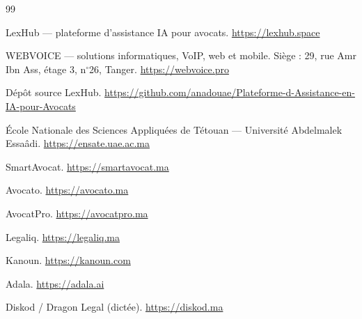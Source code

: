 \renewcommand{\bibname}{Bibliographie / Webographie}

\begin{thebibliography}{99}

LexHub --- plateforme d'assistance IA pour avocats.
\url{https://lexhub.space}

WEBVOICE --- solutions informatiques, VoIP, web et mobile. Siège : 29, rue Amr Ibn Ass, étage 3, n$^\circ$26, Tanger.
\url{https://webvoice.pro}

Dépôt source LexHub.
\url{https://github.com/anadouae/Plateforme-d-Assistance-en-IA-pour-Avocats}

École Nationale des Sciences Appliquées de Tétouan --- Université Abdelmalek Essaâdi.
\url{https://ensate.uae.ac.ma}

SmartAvocat.
\url{https://smartavocat.ma}

Avocato.
\url{https://avocato.ma}

AvocatPro.
\url{https://avocatpro.ma}

Legaliq.
\url{https://legaliq.ma}

Kanoun.
\url{https://kanoun.com}

Adala.
\url{https://adala.ai}

Diskod / Dragon Legal (dictée).
\url{https://diskod.ma}

\end{thebibliography}
